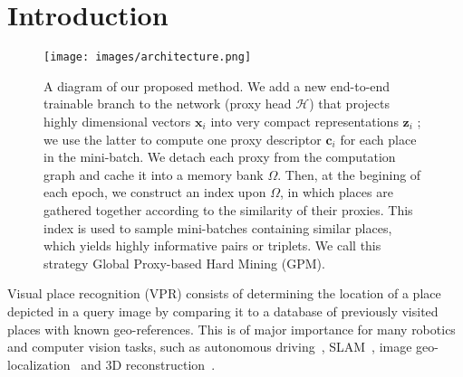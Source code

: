 \documentclass{bmvc2k}
\begin{document}
\section{Introduction}
\label{sec:intro}
\begin{figure}[th]
\centering
  \texttt{[image: images/architecture.png]}
  \vspace{0.5pt}
  \caption{A diagram of our proposed method. We add a new end-to-end trainable branch to the network (proxy head $\mathcal{H}$) that projects highly dimensional vectors $\mathbf{x}_i$ into very compact representations $\mathbf{z}_i$ ; we use the latter to compute one proxy descriptor $\mathbf{c}_i$ for each place in the mini-batch. We detach each proxy from the computation graph and cache it into a memory bank $\Omega$. Then, at the begining of each epoch, we construct an index upon $\Omega$, in which places are gathered together according to the similarity of their proxies. This index is used to sample mini-batches containing similar places, which yields highly informative pairs or triplets. We call this strategy Global Proxy-based Hard Mining (GPM).}
\label{fig:arch}
\end{figure}
Visual place recognition (VPR) consists of determining the location of a place depicted in a query image by comparing it to a database of previously visited places with known geo-references. This is of major importance for many robotics and computer vision tasks, such as autonomous driving~\cite{chowdhary2013gps, maddern20171}, SLAM~\cite{milford2012seqslam, engel2014lsd}, image geo-localization~\cite{baik2020domain, hausler2021patch, wang2022transvpr} and 3D reconstruction~\cite{cieslewski2016point, sattler2017large}.
\end{document}

